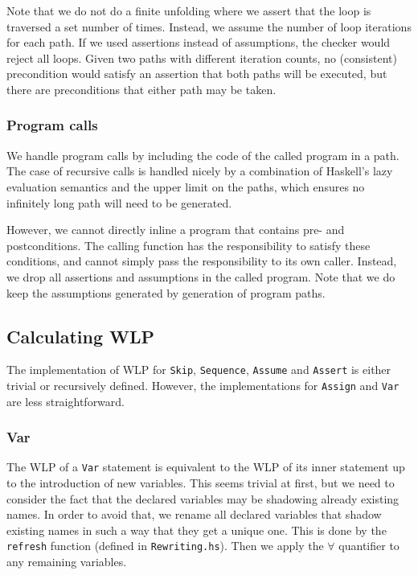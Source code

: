 \documentclass[a4paper]{article}
\begin{document}
Note that we do not do a finite unfolding where we assert that the loop is
traversed a set number of times. Instead, we assume the number of loop
iterations for each path. If we used assertions instead of assumptions, the
checker would reject all loops. Given two paths with different iteration counts,
no (consistent) precondition would satisfy an assertion that both paths will
be executed, but there are preconditions that either path may be taken.

\subsubsection*{Program calls}

We handle program calls by including the code of the called program in a path.
The case of recursive calls is handled nicely by a combination of Haskell's
lazy evaluation semantics and the upper limit on the paths, which ensures no
infinitely long path will need to be generated.

However, we cannot directly inline a program that contains pre- and
postconditions. The calling function has the responsibility to satisfy these
conditions, and cannot simply pass the responsibility to its own caller.
Instead, we drop all assertions and assumptions in the called program. Note
that we do keep the assumptions generated by generation of program paths.

\subsection{Calculating WLP}

The implementation of WLP for \texttt{Skip}, \texttt{Sequence}, \texttt{Assume}
and \texttt{Assert} is either trivial or recursively defined. However, the
implementations for \texttt{Assign} and \texttt{Var} are less straightforward.

\subsubsection*{Var}

The WLP of a \texttt{Var} statement is equivalent to the WLP of its inner
statement up to the introduction of new variables. This seems trivial at
first, but we need to consider the fact that the declared variables may be
shadowing already existing names. In order to avoid that, we rename all declared
variables that shadow existing names in such a way that they get a unique one.
This is done by the \texttt{refresh} function (defined in
\texttt{Rewriting.hs}). Then we apply the $\forall$ quantifier to any remaining
variables.
\end{document}
